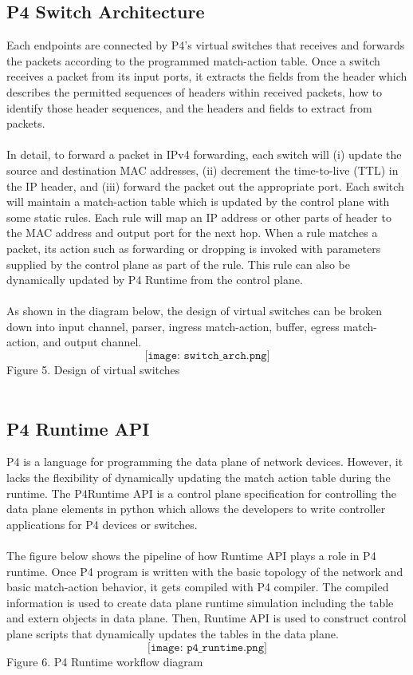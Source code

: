 \subsection{P4 Switch Architecture}
Each endpoints are connected by P4's virtual switches that receives and forwards the packets according to the programmed match-action table. Once a switch receives a packet from its input ports, it extracts the fields from the header which describes the permitted sequences of headers within received packets, how to identify those header sequences, and the headers and fields to extract from packets.\\
\\
In detail, to forward a packet in IPv4 forwarding, each switch will (i) update the source and destination MAC addresses, (ii) decrement the time-to-live (TTL) in the IP header, and (iii) forward the packet out the appropriate port. Each switch will maintain a match-action table which is updated by the control plane with some static rules. Each rule will map an IP address or other parts of header to the MAC address and output port for the next hop. When a rule matches a packet, its action such as forwarding or dropping is invoked with parameters supplied by the control plane as part of the rule. This rule can also be dynamically updated by P4 Runtime from the control plane. \\
\\
As shown in the diagram below, the design of virtual switches can be broken down into input channel, parser, ingress match-action, buffer, egress match-action, and output channel. 
\\
$$
\texttt{[image: switch\_arch.png]}
$$
Figure 5. Design of virtual switches\\
\\
\subsection{P4 Runtime API}
 P4 is a language for programming the data plane of network devices. However, it lacks the flexibility of dynamically updating the match action table during the runtime. The P4Runtime API is a control plane specification for controlling the data plane elements in python which allows the developers to write controller applications for P4 devices or switches. \\
 \\
 The figure below shows the pipeline of how Runtime API plays a role in P4 runtime. Once P4 program is written with the basic topology of the network and basic match-action behavior, it gets compiled with P4 compiler. The compiled information is used to create data plane runtime simulation including the table and extern objects in data plane. Then, Runtime API is used to construct control plane scripts that dynamically updates the tables in the data plane.
$$
\texttt{[image: p4\_runtime.png]}
$$
Figure 6. P4 Runtime workflow diagram\\
\\


